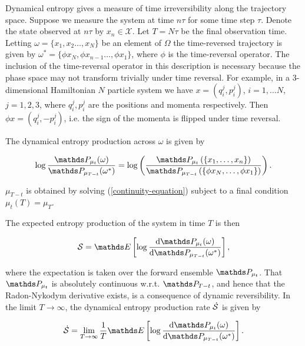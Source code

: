 Dynamical entropy gives a measure of time irreversibility along the trajectory space. Suppose we measure the system at time $n\tau$ for some time step $\tau$. Denote the state observed at $n\tau$ by $x_n \in \mathcal{X}$. Let $T = N\tau$ be the final observation time. Letting $\omega = \{x_1, x_2\ldots, x_N\}$ be an element of $\Omega$ the time-reversed trajectory is given by $\omega^\ast = \{ \phi x_N, \phi x_{n-1} \ldots, \phi x_1\}$, where $\phi$ is the time-reversal operator. The inclusion of the time-reversal operator in this description is necessary because the phase space may not transform trivially under time reversal. For example, in a 3-dimensional Hamiltonian $N$ particle system we have $x = \left(q_i^j, p_i^j\right)$, $i = 1, \ldots N$, $j = 1,2,3$, where $q_i^j, p_i^j$ are the positions and momenta respectively. Then $\phi x = \left(q_i^j, -p_i^j\right)$, i.e. the sign of the momenta is flipped under time reversal. 

The dynamical entropy production across $\omega$ is given by \cite{maes2003time} 

\begin{align}
\log \frac{\bP_{\mu_t}(\omega)}{\bP_{\mu_{T-t}}(\omega^\ast)} = \log \left ( \frac{\bP_{\mu_t}\left(\{ x_1, \ldots, x_n\} \right )}{\bP_{\mu_{T-t}}\left(\{ \phi x_N, \ldots, \phi x_1\}\right)} \right).
\end{align}

$\mu_{T-t}$ is obtained by solving (\ref{continuity-equation}) subject to a final condition $\mu_t(T)= \mu_T$. 

The expected entropy production of the system in time $T$ is then 

\begin{align}\label{ent-prod-main}
\mathcal{S} = \bE \left [\log \frac{\rmd\bP_{\mu_t}(\omega)}{\rmd\bP_{\mu_{T-t}}(\omega^\ast)} \right],
\end{align}

where the expectation is taken over the forward ensemble $\bP_{\mu_t}$. That $\bP_{\mu_t}$ is absolutely continuous w.r.t. $\bP_{T-t}$, and hence that the Radon-Nykodym derivative exists, is a consequence of dynamic reversibility. In the limit $T \rightarrow \infty$, the dynamical entropy production rate $\dot{\mathcal{S}}$ is given by \cite{gaspard2004time}

\begin{align}\label{ent-prod-rate-main}
\entpp= \lim_{T\rightarrow \infty} \frac{1}{T} \bE \left [\log \frac{\rmd\bP_{\mu_t}(\omega)}{\rmd\bP_{\mu_{T-t}}(\omega^\ast)} \right].
\end{align}


